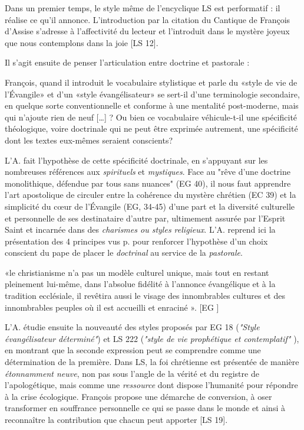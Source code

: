 Dans un premier temps, le style même de l'encyclique LS est performatif : il réalise ce qu'il annonce. L'introduction par la citation du Cantique de François d'Assise s'adresse à l'affectivité du lecteur et l'introduit dans le  mystère joyeux que nous  contemplons dans la joie [LS 12].

Il s'agit ensuite de penser l'articulation entre doctrine et pastorale : 

\begin{singlequote}
    François, quand il introduit le vocabulaire stylistique et parle du «style de vie de l'Évangile» et d'un «style évangélisateur» se sert-il d'une terminologie secondaire, en quelque sorte conventionnelle et conforme à une mentalité post-moderne, mais qui n'ajoute rien de neuf [\ldots] ? Ou bien ce vocabulaire véhicule-t-il une spécificité théologique, voire doctrinale qui ne peut être exprimée autrement, une spécificité dont les textes eux-mêmes seraient conscients?  \cite[p. 180]{theobald_courage_2021}
\end{singlequote}
L'A. fait l'hypothèse de cette spécificité doctrinale, en s'appuyant sur les nombreuses références aux \textit{spirituels} et \textit{mystiques}. Face au "rêve d'une doctrine monolithique, défendue par tous sans nuances" (EG 40), il nous faut apprendre l'art apostolique de circuler entre la cohérence du mystère chrétien (EC 39) et la simplicité du cœur de l'Évangile (EG, 34-45) d'une part et la diversité culturelle et personnelle de ses destinataire d'autre par, ultimement assurée par l'Esprit Saint et incarnée dans des \textit{charismes ou styles religieux}. L'A. reprend ici la présentation des 4 principes vus p. \pageref{theo:principesLS} pour renforcer l'hypothèse d'un choix conscient du pape de placer le \textit{doctrinal} au service de la \textit{pastorale}.
\begin{singlequote}
    «le christianisme n'a pas un modèle culturel unique, mais tout en restant pleinement lui-même, dans l'absolue fidélité à l'annonce évangélique et à la tradition ecclésiale, il revêtira aussi le visage des innombrables cultures et des innombrables peuples où il est accueilli et enraciné ».  [EG ]
\end{singlequote}
L'A. étudie ensuite la nouveauté des styles proposés par EG 18 (\textit{"Style évangélisateur déterminé"}) et LS 222 (\textit{"style de vie prophétique et contemplatif" }), en montrant que la seconde expression peut se comprendre comme une détermination de la première.
Dans LS, la foi chrétienne est présentée de manière \textit{étonnamment neuve}, non pas sous l'angle de la vérité et du registre de l'apologétique, mais comme une \textit{ressource} dont dispose l'humanité pour répondre à la crise écologique. François propose une démarche de conversion, à oser transformer en souffrance personnelle ce qui se passe dans le monde et ainsi à reconnaître la contribution que chacun peut apporter [LS 19]. \label{theo:mourning}

